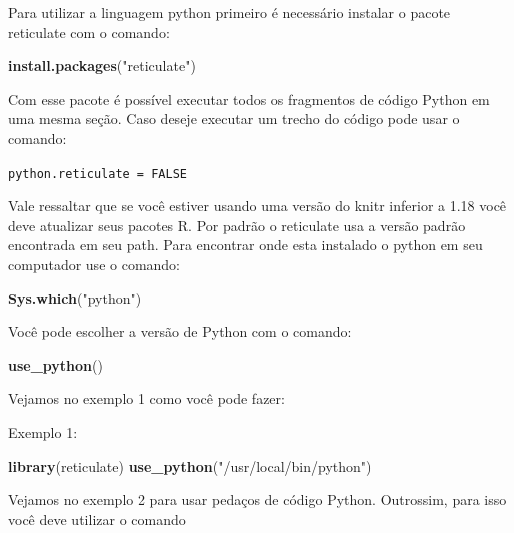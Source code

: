 \documentclass[
]{book}
\newenvironment{Shaded}{\begin{snugshade}}{\end{snugshade}}
\newcommand{\KeywordTok}[1]{\textcolor[rgb]{0.13,0.29,0.53}{\textbf{#1}}}
\newcommand{\NormalTok}[1]{#1}
\newcommand{\OperatorTok}[1]{\textcolor[rgb]{0.81,0.36,0.00}{\textbf{#1}}}
\newcommand{\StringTok}[1]{\textcolor[rgb]{0.31,0.60,0.02}{#1}}
\begin{document}
Para utilizar a linguagem python primeiro é necessário instalar o pacote reticulate com o comando:

\begin{Shaded}
\begin{Highlighting}[]
\KeywordTok{install.packages}\NormalTok{(}\StringTok{"reticulate"}\NormalTok{)}
\end{Highlighting}
\end{Shaded}

Com esse pacote é possível executar todos os fragmentos de código Python em uma mesma seção. Caso deseje executar um trecho do código pode usar o comando:

\texttt{python.reticulate\ =\ FALSE}

Vale ressaltar que se você estiver usando uma versão do knitr inferior a 1.18 você deve atualizar seus pacotes R. Por padrão o reticulate usa a versão padrão encontrada em seu path. Para encontrar onde esta instalado o python em seu computador use o comando:

\begin{Shaded}
\begin{Highlighting}[]
\KeywordTok{Sys.which}\NormalTok{(}\StringTok{"python"}\NormalTok{)}
\end{Highlighting}
\end{Shaded}

Você pode escolher a versão de Python com o comando:

\begin{Shaded}
\begin{Highlighting}[]
\KeywordTok{use\_python}\NormalTok{()}
\end{Highlighting}
\end{Shaded}

Vejamos no exemplo 1 como você pode fazer:

Exemplo 1:

\begin{Shaded}
\begin{Highlighting}[]
\KeywordTok{library}\NormalTok{(reticulate)}
\KeywordTok{use\_python}\NormalTok{(}\StringTok{"/usr/local/bin/python"}\NormalTok{)}
\end{Highlighting}
\end{Shaded}

Vejamos no exemplo 2 para usar pedaços de código Python. Outrossim, para isso você deve utilizar o comando

\begin{Shaded}
\end{Shaded}
\end{document}
